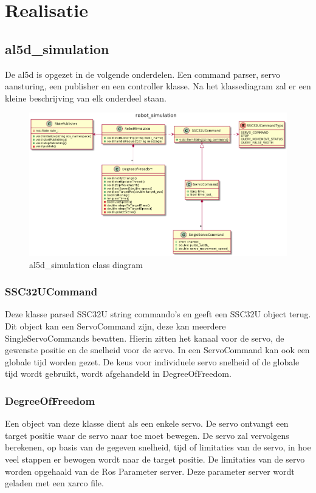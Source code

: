 \documentclass[11pt,titlepage]{article}
\begin{document}
\section{Realisatie}

\subsection{al5d\_simulation}

De al5d is opgezet in de volgende onderdelen. Een command parser, servo aansturing, een publisher en een controller klasse. Na het klassediagram zal er een kleine beschrijving van elk onderdeel staan.

\begin{figure}[H]
\centering
    \includegraphics[scale = .4]{robot_sim_plantuml.png}
    \caption{al5d\_simulation class diagram}
    \label{figure:al5d_simulation}
\end{figure}

\subsubsection{SSC32UCommand}
Deze klasse parsed SSC32U string commando's en geeft een SSC32U object terug. Dit object kan een ServoCommand zijn, deze kan meerdere SingleServoCommands bevatten. Hierin zitten het kanaal voor de servo, de gewenste positie en de snelheid voor de servo. In een ServoCommand kan ook een globale tijd worden gezet. De keus voor individuele servo snelheid of de globale tijd wordt gebruikt, wordt afgehandeld in DegreeOfFreedom.

\subsubsection{DegreeOfFreedom}
Een object van deze klasse dient als een enkele servo. De servo ontvangt een target positie waar de servo naar toe moet bewegen. De servo zal vervolgens berekenen, op basis van de gegeven snelheid, tijd of limitaties van de servo, in hoe veel stappen er bewogen wordt naar de target positie. De limitaties van de servo worden opgehaald van de Ros Parameter server. Deze parameter server wordt geladen met een xarco file.
\end{document}
